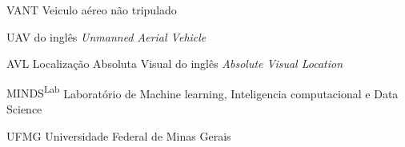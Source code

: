 \begin{siglas}
  
  \item[VANT] Veiculo aéreo não tripulado
  \item[UAV] do inglês \textit{Unmanned Aerial Vehicle}
  \item[AVL] Localização Absoluta Visual do inglês \textit{Absolute Visual Location}
  \item[MINDS\textsuperscript{Lab}] Laboratório de Machine learning, Inteligencia computacional e Data Science
  \item[UFMG] Universidade Federal de Minas Gerais
 
\end{siglas}
